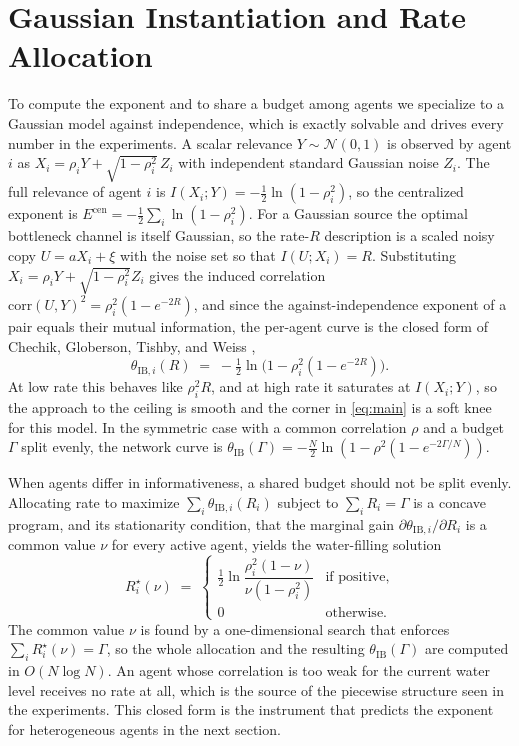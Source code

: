 \documentclass[journal]{IEEEtran}
\theoremstyle{definition}
\theoremstyle{remark}
\newcommand{\Ecen}{E^{\mathrm{cen}}}
\newcommand{\tib}{\theta_{\mathrm{IB}}}
\newcommand{\tibi}{\theta_{\mathrm{IB},i}}
\begin{document}
\section{Gaussian Instantiation and Rate Allocation}\label{sec:gaussian}
To compute the exponent and to share a budget among agents we specialize to a Gaussian model against
independence, which is exactly solvable and drives every number in the experiments. A scalar relevance
$Y\sim\mathcal N(0,1)$ is observed by agent $i$ as $X_i=\rho_i Y+\sqrt{1-\rho_i^2}\,Z_i$ with independent standard
Gaussian noise $Z_i$. The full relevance of agent $i$ is $I(X_i;Y)=-\tfrac12\ln(1-\rho_i^2)$, so the centralized
exponent is $\Ecen=-\tfrac12\sum_i\ln(1-\rho_i^2)$. For a Gaussian source the optimal bottleneck channel is itself
Gaussian, so the rate-$R$ description is a scaled noisy copy $U=aX_i+\xi$ with the noise set so that $I(U;X_i)=R$.
Substituting $X_i=\rho_i Y+\sqrt{1-\rho_i^2}Z_i$ gives the induced correlation
$\mathrm{corr}(U,Y)^2=\rho_i^2(1-e^{-2R})$, and since the against-independence exponent of a pair equals their
mutual information, the per-agent curve is the closed form of Chechik, Globerson, Tishby, and Weiss
\cite{chechik2005},
\begin{equation}
\tibi(R)\;=\;-\tfrac12\ln\!\big(1-\rho_i^2(1-e^{-2R})\big).\label{eq:gib}
\end{equation}
At low rate this behaves like $\rho_i^2 R$, and at high rate it saturates at $I(X_i;Y)$, so the approach to the
ceiling is smooth and the corner in \eqref{eq:main} is a soft knee for this model. In the symmetric case with a
common correlation $\rho$ and a budget $\Gamma$ split evenly, the network curve is
$\tib(\Gamma)=-\tfrac{N}{2}\ln(1-\rho^2(1-e^{-2\Gamma/N}))$.

When agents differ in informativeness, a shared budget should not be split evenly. Allocating rate to maximize
$\sum_i \tibi(R_i)$ subject to $\sum_i R_i=\Gamma$ is a concave program, and its stationarity condition, that the
marginal gain $\partial \tibi/\partial R_i$ is a common value $\nu$ for every active agent, yields the
water-filling solution
\begin{equation}
R_i^\star(\nu)\;=\;
\begin{cases}
\tfrac12\ln\!\dfrac{\rho_i^2(1-\nu)}{\nu(1-\rho_i^2)} & \text{if positive},\\[2pt]
0 & \text{otherwise}.
\end{cases}
\label{eq:waterfill}
\end{equation}
The common value $\nu$ is found by a one-dimensional search that enforces $\sum_i R_i^\star(\nu)=\Gamma$, so the
whole allocation and the resulting $\tib(\Gamma)$ are computed in $O(N\log N)$. An agent whose correlation is too
weak for the current water level receives no rate at all, which is the source of the piecewise structure seen in
the experiments. This closed form is the instrument that predicts the exponent for heterogeneous agents in the
next section.
\end{document}

